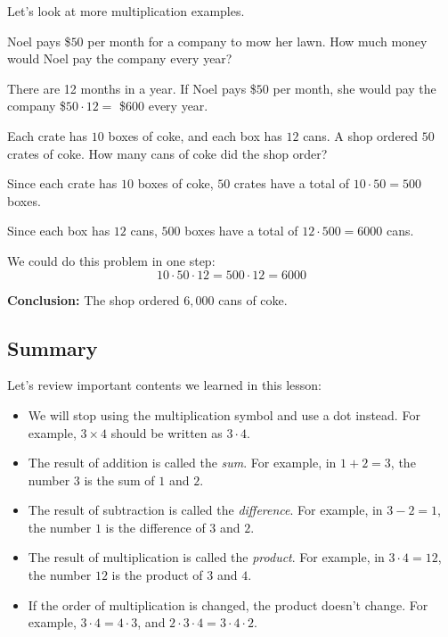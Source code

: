 Let's look at more multiplication examples.

\begin{myexample}
   Noel pays \$$50$ per month for a company to mow her lawn. How much money would Noel pay the company every year?
\end{myexample}
\begin{solution}
	There are 12 months in a year. If Noel pays \$$50$ per month, she would pay the company \$$50 \cdot 12 =$ \$$600$ every year. 
\end{solution}

\begin{myexample}
	Each crate has $10$ boxes of coke, and each box has $12$ cans. A shop ordered $50$ crates of coke. How many cans of coke did the shop order?
\end{myexample}
\begin{solution}
Since each crate has $10$ boxes of coke, $50$ crates have a total of $10 \cdot 50 = 500$ boxes.

Since each box has $12$ cans, $500$ boxes have a total of $12 \cdot 500 = 6000$ cans.

We could do this problem in one step:
	\[ 10 \cdot 50 \cdot 12 = 500 \cdot 12 = 6000 \]
	
\textbf{Conclusion:} The shop ordered $6,000$ cans of coke.
\end{solution}

\subsection{Summary}
Let's review important contents we learned in this lesson:

\begin{itemize}
\item We will stop using the multiplication symbol and use a dot instead. For example, $3 \times 4$ should be written as $3 \cdot 4$.
\item The result of addition is called the \textit{sum}. For example, in $1+2=3$, the number $3$ is the sum of $1$ and $2$.
\item The result of subtraction is called the \textit{difference}. For example, in $3-2=1$, the number $1$ is the difference of $3$ and $2$.
\item The result of multiplication is called the \textit{product}. For example, in $3 \cdot 4 = 12$, the number $12$ is the product of $3$ and $4$.
\item If the order of multiplication is changed, the product doesn't change. For example, $3 \cdot 4 = 4 \cdot 3$, and $2 \cdot 3 \cdot 4 = 3 \cdot 4 \cdot 2$.
\end{itemize}
